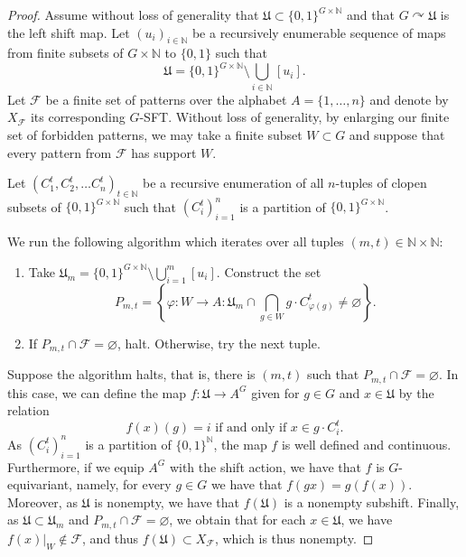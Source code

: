 \documentclass{article}
\theoremstyle{definition}
\theoremstyle{plain}
\newcommand{\NN}{\mathbb{N}}
\newcommand{\FF}{\mathcal{F}}
\begin{document}
\begin{proof}
   Assume without loss of generality that $\mathfrak{U}\subset \{0,1\}^{G \times \NN}$ and that $G\curvearrowright \mathfrak{U}$ is the left shift map. Let $(u_i)_{i \in \NN}$ be a recursively enumerable sequence of maps from finite subsets of $G \times \NN$ to $\{0,1\}$ such that \[ \mathfrak{U} = \{0,1\}^{G\times \NN}\setminus \bigcup_{i \in \NN}[u_i].\] Let $\FF$ be a finite set of patterns over the alphabet $A=\{1,\dots,n\}$ and denote by $X_{\FF}$ its corresponding $G$-SFT. Without loss of generality, by enlarging our finite set of forbidden patterns, we may take a finite subset $W\subset G$ and suppose that every pattern from $\FF$ has support $W$.
    
    Let $(C^t_1,C^t_2,\dots C^t_n)_{t \in \NN}$ be a recursive enumeration of all $n$-tuples of clopen subsets of $\{0,1\}^{G\times \NN}$ such that $(C^t_i)_{i=1}^n$ is a partition of $\{0,1\}^{G\times \NN}$.

    We run the following algorithm which iterates over all tuples $(m,t) \in \NN\times \NN$:
    \begin{enumerate}
        \item Take $\mathfrak{U}_m = \{0,1\}^{G \times \NN}\setminus \bigcup_{i =1}^m[u_i]$. Construct the set \[ P_{m,t} =  \left\{\varphi \colon W \to A : \mathfrak{U}_m\cap \bigcap_{g \in W}g \cdot C^t_{\varphi(g)}   \neq \varnothing \right\}.   \]
        \item If $P_{m,t}\cap \FF = \varnothing$, halt. Otherwise, try the next tuple.
    \end{enumerate}

    Suppose the algorithm halts, that is, there is $(m,t)$ such that $P_{m,t}\cap \FF = \varnothing$. In this case, we can define the map $f\colon \mathfrak{U} \to A^G$ given for $g\in G$ and $x \in \mathfrak{U}$ by the relation \[ f(x)(g) = i \mbox{ if and only if } x \in g\cdot C^t_i.   \] 
    As $(C^t_i)_{i=1}^n$ is a partition of $\{0,1\}^{\NN}$, the map $f$ is well defined and continuous. Furthermore, if we equip $A^G$ with the shift action, we have that $f$ is $G$-equivariant, namely, for every $g \in G$ we have that $f(gx) = g(f(x))$. Moreover, as $\mathfrak{U}$ is nonempty, we have that $f(\mathfrak{U})$ is a nonempty subshift. Finally, as $\mathfrak{U}\subset \mathfrak{U}_m$ and $P_{m,t}\cap \FF = \varnothing$, we obtain that for each $x\in \mathfrak{U}$, we have $f(x)|_W \notin \FF$, and thus $f(\mathfrak{U})\subset X_{\FF}$, which is thus nonempty.


\end{proof}
\end{document}
